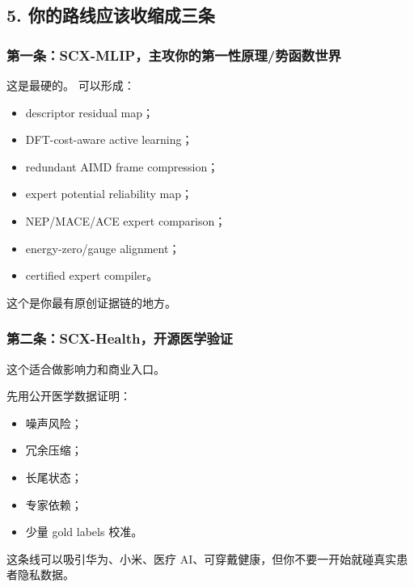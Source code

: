 \documentclass[
  12pt,
]{ctexart}
\providecommand{\tightlist}{%
  \setlength{\itemsep}{0pt}\setlength{\parskip}{0pt}}
\begin{document}
\subsection{5.
你的路线应该收缩成三条}\label{ux4f60ux7684ux8defux7ebfux5e94ux8be5ux6536ux7f29ux6210ux4e09ux6761}

\subsubsection{第一条：SCX-MLIP，主攻你的第一性原理/势函数世界}\label{ux7b2cux4e00ux6761scx-mlipux4e3bux653bux4f60ux7684ux7b2cux4e00ux6027ux539fux7406ux52bfux51fdux6570ux4e16ux754c}

这是最硬的。 可以形成：

\begin{itemize}
\tightlist
\item
  descriptor residual map；
\item
  DFT-cost-aware active learning；
\item
  redundant AIMD frame compression；
\item
  expert potential reliability map；
\item
  NEP/MACE/ACE expert comparison；
\item
  energy-zero/gauge alignment；
\item
  certified expert compiler。
\end{itemize}

这个是你最有原创证据链的地方。

\subsubsection{第二条：SCX-Health，开源医学验证}\label{ux7b2cux4e8cux6761scx-healthux5f00ux6e90ux533bux5b66ux9a8cux8bc1}

这个适合做影响力和商业入口。

先用公开医学数据证明：

\begin{itemize}
\tightlist
\item
  噪声风险；
\item
  冗余压缩；
\item
  长尾状态；
\item
  专家依赖；
\item
  少量 gold labels 校准。
\end{itemize}

这条线可以吸引华为、小米、医疗
AI、可穿戴健康，但你不要一开始就碰真实患者隐私数据。
\end{document}
